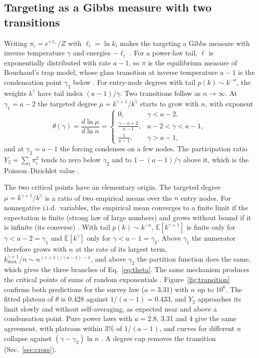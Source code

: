 \documentclass[pre,twocolumn,superscriptaddress,amsmath,amssymb,floatfix]{revtex4-2}
\newcommand{\E}{\mathbb{E}}
\begin{document}
\subsection{Targeting as a Gibbs measure with two transitions}
Writing $\pi_i=e^{\gamma\ell_i}/Z$ with $\ell_i=\ln k_i$ makes the targeting a Gibbs
measure with inverse temperature $\gamma$ and energies $-\ell_i$
\cite{derrida1981random}. For a power-law tail, $\ell$ is exponentially distributed
with rate $a-1$, so $\pi$ is the equilibrium measure of Bouchaud's trap model,
whose glass transition at inverse temperature $a-1$ is the condensation point
$\gamma_2$ below \cite{bouchaud1992weak,bouchaud1995aging}. For entry-node degrees with tail $p(k)\sim k^{-a}$, the
weights $k^\gamma$ have tail index $(a-1)/\gamma$. Two transitions follow as $n\to\infty$.
At $\gamma_1=a-2$ the targeted degree $\mu=\overline{k^{\gamma+1}}/\overline{k^{\gamma}}$ starts to grow with $n$,
with exponent
\begin{equation}\label{eq:theta}
\theta(\gamma)=\frac{d\ln\mu}{d\ln n}=\begin{cases}0,&\gamma<a-2,\\ \frac{\gamma-a+2}{a-1},&a-2<\gamma<a-1,\\ \frac{1}{a-1},&\gamma>a-1,\end{cases}
\end{equation}
and at $\gamma_2=a-1$ the forcing condenses on a few nodes. The participation ratio
$Y_2=\sum_i\pi_i^2$ tends to zero below $\gamma_2$ and to $1-(a-1)/\gamma$ above it, which is the
Poisson--Dirichlet value \cite{derrida1997random,pitman1997two,filiasi2014condensation}.

The two critical points have an elementary origin. The targeted degree
$\mu=\overline{k^{\gamma+1}}/\overline{k^{\gamma}}$ is a ratio of two empirical means over the $n$ entry
nodes. For nonnegative i.i.d.\ variables, the empirical mean converges to a
finite limit if the expectation is finite (strong law of large numbers) and
grows without bound if it is infinite (its converse) \cite{durrett2019probability}.
With tail $p(k)\sim k^{-a}$, $\E[k^{\gamma+1}]$ is finite only for $\gamma<a-2=\gamma_1$ and $\E[k^\gamma]$ only
for $\gamma<a-1=\gamma_2$. Above $\gamma_1$ the numerator therefore grows with $n$ at the rate of
its largest term, $k_{\max}^{\gamma+1}/n\sim n^{(\gamma+1)/(a-1)-1}$, and above $\gamma_2$ the partition
function does the same, which gives the three branches of Eq.~\eqref{eq:theta}.
The same mechanism produces the critical points of sums of random exponentials
\cite{benarous2005limit}. Figure~\ref{fig:transition} confirms both predictions
for the survey law ($a=3.31$) with $n$ up to $10^6$. The fitted plateau of $\theta$ is
0.428 against $1/(a-1)=0.433$, and $Y_2$ approaches its limit slowly and without
self-averaging, as expected near and above a condensation point. Pure power
laws with $a=2.8$, 3.31 and 4 give the same agreement, with plateaus within 3\%
of $1/(a-1)$, and curves for different $n$ collapse against $(\gamma-\gamma_2)\ln n$
\cite{SM}. A degree cap removes the transition (Sec.~\ref{sec:cross}).
\end{document}
